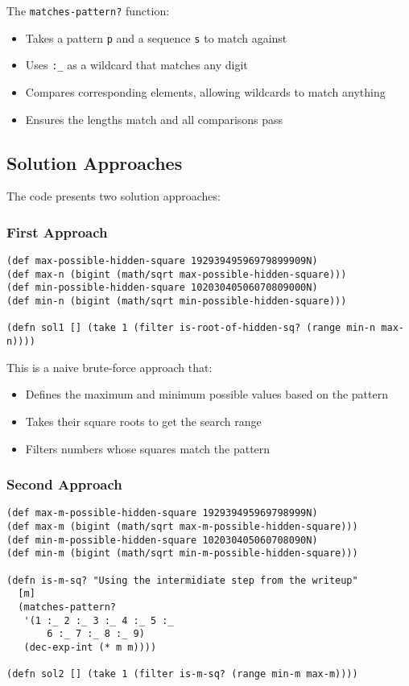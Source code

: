 \documentclass{article}
\begin{document}
The \texttt{matches-pattern?} function:
\begin{itemize}
    \item Takes a pattern \texttt{p} and a sequence \texttt{s} to match against
    \item Uses \texttt{:\_} as a wildcard that matches any digit
    \item Compares corresponding elements, allowing wildcards to match anything
    \item Ensures the lengths match and all comparisons pass
\end{itemize}

\subsection{Solution Approaches}

The code presents two solution approaches:

\subsubsection{First Approach}
\begin{lstlisting}
(def max-possible-hidden-square 19293949596979899909N)
(def max-n (bigint (math/sqrt max-possible-hidden-square)))
(def min-possible-hidden-square 10203040506070809000N)
(def min-n (bigint (math/sqrt min-possible-hidden-square)))

(defn sol1 [] (take 1 (filter is-root-of-hidden-sq? (range min-n max-n))))
\end{lstlisting}

This is a naive brute-force approach that:
\begin{itemize}
    \item Defines the maximum and minimum possible values based on the pattern
    \item Takes their square roots to get the search range
    \item Filters numbers whose squares match the pattern
\end{itemize}

\subsubsection{Second Approach}
\begin{lstlisting}
(def max-m-possible-hidden-square 192939495969798999N)
(def max-m (bigint (math/sqrt max-m-possible-hidden-square)))
(def min-m-possible-hidden-square 102030405060708090N)
(def min-m (bigint (math/sqrt min-m-possible-hidden-square)))

(defn is-m-sq? "Using the intermidiate step from the writeup"
  [m]
  (matches-pattern?
   '(1 :_ 2 :_ 3 :_ 4 :_ 5 :_
       6 :_ 7 :_ 8 :_ 9)
   (dec-exp-int (* m m))))

(defn sol2 [] (take 1 (filter is-m-sq? (range min-m max-m))))
\end{lstlisting}
\end{document}
